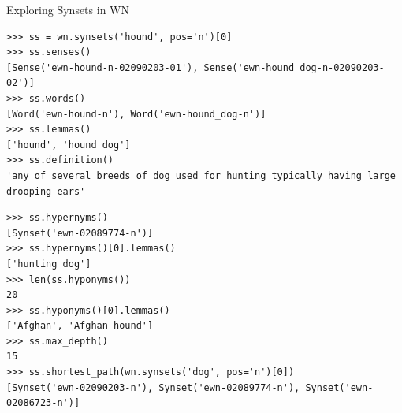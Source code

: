 \documentclass[aspectratio=169]{beamer}
\begin{document}
\begin{frame}{Exploring Synsets in WN}
\begin{verbatim}
>>> ss = wn.synsets('hound', pos='n')[0]
>>> ss.senses()
[Sense('ewn-hound-n-02090203-01'), Sense('ewn-hound_dog-n-02090203-02')]
>>> ss.words()
[Word('ewn-hound-n'), Word('ewn-hound_dog-n')]
>>> ss.lemmas()
['hound', 'hound dog']
>>> ss.definition()
'any of several breeds of dog used for hunting typically having large drooping ears'
\end{verbatim}
\framebreak
\begin{verbatim}
>>> ss.hypernyms()
[Synset('ewn-02089774-n')]
>>> ss.hypernyms()[0].lemmas()
['hunting dog']
>>> len(ss.hyponyms())
20
>>> ss.hyponyms()[0].lemmas()
['Afghan', 'Afghan hound']
>>> ss.max_depth()
15
>>> ss.shortest_path(wn.synsets('dog', pos='n')[0])
[Synset('ewn-02090203-n'), Synset('ewn-02089774-n'), Synset('ewn-02086723-n')]
\end{verbatim}
\end{frame}
\end{document}
